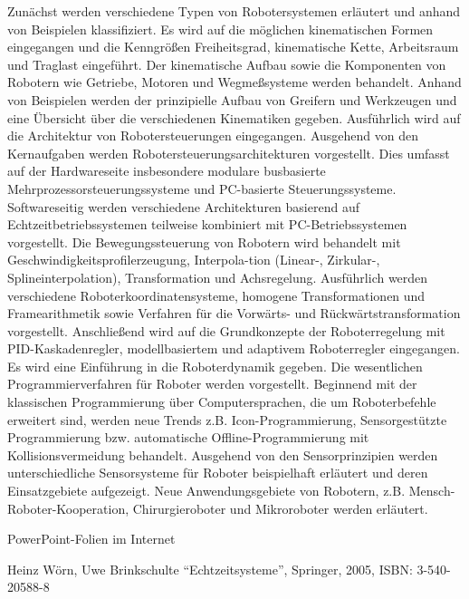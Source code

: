 \begin{course}
\begin{content}
Zunächst werden verschiedene Typen von Robotersystemen erläutert und anhand von Beispielen klassifiziert. Es wird auf die möglichen kinematischen Formen eingegangen und die Kenngrößen Freiheitsgrad, kinematische Kette, Arbeitsraum und Traglast eingeführt. Der kinematische Aufbau sowie die Komponenten von Robotern wie Getriebe, Motoren und Wegmeßsysteme werden behandelt. Anhand von Beispielen werden der prinzipielle Aufbau von Greifern und Werkzeugen und eine Übersicht über die verschiedenen Kinematiken gegeben. Ausführlich wird auf die Architektur von Robotersteuerungen eingegangen. Ausgehend von den Kernaufgaben werden Robotersteuerungsarchitekturen vorgestellt. Dies umfasst auf der Hardwareseite insbesondere modulare busbasierte Mehrprozessorsteuerungssysteme und PC-basierte Steuerungssysteme. Softwareseitig werden verschiedene Architekturen basierend auf Echtzeitbetriebssystemen teilweise kombiniert mit PC-Betriebssystemen vorgestellt. Die Bewegungssteuerung von Robotern wird behandelt mit Geschwindigkeitsprofilerzeugung, Interpola-tion (Linear-, Zirkular-, Splineinterpolation), Transformation und Achsregelung. Ausführlich werden verschiedene Roboterkoordinatensysteme, homogene Transformationen und Framearithmetik sowie Verfahren für die Vorwärts- und Rückwärtstransformation vorgestellt. Anschließend wird auf die Grundkonzepte der Roboterregelung mit PID-Kaskadenregler, modellbasiertem und adaptivem Roboterregler eingegangen. Es wird eine Einführung in die Roboterdynamik gegeben. Die wesentlichen Programmierverfahren für Roboter werden vorgestellt. Beginnend mit der klassischen Programmierung über Computersprachen, die um Roboterbefehle erweitert sind, werden neue Trends z.B. Icon-Programmierung, Sensorgestützte Programmierung bzw. automatische Offline-Programmierung mit Kollisionsvermeidung behandelt. Ausgehend von den Sensorprinzipien werden unterschiedliche Sensorsysteme für Roboter beispielhaft erläutert und deren Einsatzgebiete aufgezeigt. Neue Anwendungsgebiete von Robotern, z.B. Mensch-Roboter-Kooperation, Chirurgieroboter und Mikroroboter werden erläutert.


\end{content}

\begin{media}PowerPoint-Folien im Internet

\end{media}

\begin{literature}Heinz Wörn, Uwe Brinkschulte “Echtzeitsysteme”, Springer, 2005, ISBN: 3-540-20588-8


\end{literature}
\end{course}
